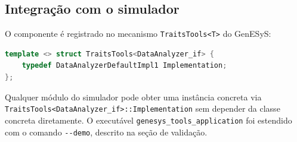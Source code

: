 \subsection{Integração com o simulador}

O componente é registrado no mecanismo \texttt{TraitsTools<T>} do GenESyS:

\begin{lstlisting}[language=C++, caption={Registro em TraitsTools.h}]
template <> struct TraitsTools<DataAnalyzer_if> {
    typedef DataAnalyzerDefaultImpl1 Implementation;
};
\end{lstlisting}

Qualquer módulo do simulador pode obter uma instância concreta via \texttt{TraitsTools<DataAnalyzer\_if>::Implementation} sem depender da classe concreta diretamente. O executável \texttt{genesys\_tools\_application} foi estendido com o comando \texttt{-{}-demo}, descrito na seção de validação.
